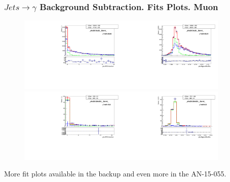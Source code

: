 \begin{frame}\frametitle{$Jets \rightarrow \gamma$ Background Subtraction. Fits Plots. Muon}
  \begin{figure}[htb]
    \begin{center}
       \includegraphics[width=0.45\textwidth]{../figs/figs_v11/MUON_WGamma/TemplateFits/c_TEMPL_CHISO_UNblind__phoEt15to20__Barrel__RooFit.pdf}\includegraphics[width=0.45\textwidth]{../figs/figs_v11/MUON_WGamma/TemplateFits/c_TEMPL_SIHIH_UNblind__phoEt15to20__Barrel__RooFit.pdf}\\
 \includegraphics[width=0.45\textwidth]{../figs/figs_v11/MUON_WGamma/TemplateFits/c_TEMPL_CHISO_UNblind__phoEt120to500__Barrel__RooFit.pdf}\includegraphics[width=0.45\textwidth]{../figs/figs_v11/MUON_WGamma/TemplateFits/c_TEMPL_SIHIH_UNblind__phoEt120to500__Barrel__RooFit.pdf}
    \end{center}
  \end{figure}
  \tiny More fit plots available in the backup and even more in the AN-15-055.
\end{frame}%
